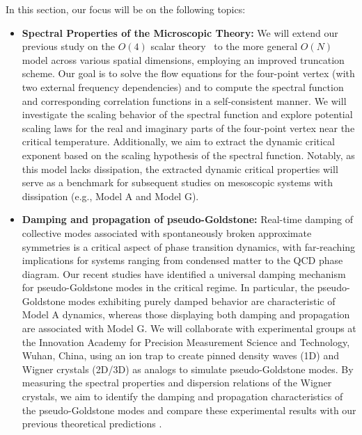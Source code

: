 \documentclass[letterpaper,11pt]{article}
\begin{document}
In this section, our focus will be on the following topics:
\begin{itemize}
\item {\bf Spectral Properties of the Microscopic Theory:} We will extend our previous study on the $O(4)$ scalar theory~\cite{Tan:2021zid} to the more general $O(N)$ model across various spatial dimensions, employing an improved truncation scheme. Our goal is to solve the flow equations for the four-point vertex (with two external frequency dependencies) and to compute the spectral function and corresponding correlation functions in a self-consistent manner. We will investigate the scaling behavior of the spectral function and explore potential scaling laws for the real and imaginary parts of the four-point vertex near the critical temperature. Additionally, we aim to extract the dynamic critical exponent based on the scaling hypothesis of the spectral function. Notably, as this model lacks dissipation, the extracted dynamic critical properties will serve as a benchmark for subsequent studies on mesoscopic systems with dissipation (e.g., Model A and Model G).


\item {\bf Damping and propagation of pseudo-Goldstone:} Real-time damping of collective modes associated with spontaneously broken approximate symmetries is a critical aspect of phase transition dynamics, with far-reaching implications for systems ranging from condensed matter to the QCD phase diagram. Our recent studies have identified a universal damping mechanism for pseudo-Goldstone modes in the critical regime. In particular, the pseudo-Goldstone modes exhibiting purely damped behavior are characteristic of Model A dynamics, whereas those displaying both damping and propagation are associated with Model G. We will collaborate with experimental groups at the Innovation Academy for Precision Measurement Science and Technology, Wuhan, China, using an ion trap to create pinned density waves (1D) and Wigner crystals (2D/3D) as analogs to simulate pseudo-Goldstone modes. By measuring the spectral properties and dispersion relations of the Wigner crystals, we aim to identify the damping and propagation characteristics of the pseudo-Goldstone modes and compare these experimental results with our previous theoretical predictions \cite{Tan:2024fuq}.


\end{itemize}
\end{document}

